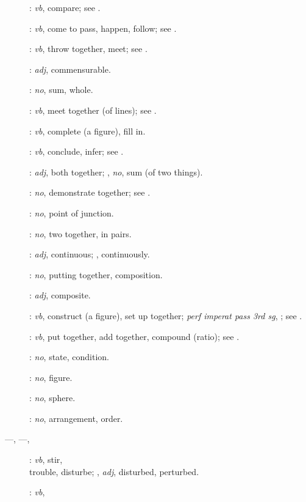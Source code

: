 {\begin{description}
\item[]: {\em vb}, compare; see .
\item[]: {\em vb}, come to pass, happen, follow; see
.
\item[]: {\em vb}, throw together, meet; see .
\item[]: {\em adj}, commensurable.
\item[]: {\em no}, sum, whole.
\item[]: {\em vb}, meet together (of lines); see .
\item[]: {\em vb}, complete (a figure), fill in.
\item[]: {\em vb}, conclude, infer; see .
\item[]: {\em adj}, both together;
, {\em no}, sum (of two things).
\item[]: {\em no}, demonstrate together; see .
\item[]: {\em no}, point of junction.
\item[]: {\em no}, two together, in pairs.
\item[]: {\em adj}, continuous; , 
continuously.
\item[]: {\em no}, putting together, composition.
\item[]: {\em adj}, composite.
\item[]: {\em vb}, construct (a figure), set up together;  {\em perf imperat pass 3rd sg}, ; see .
\item[]: {\em vb}, put together, add together, compound (ratio); see .
\item[]: {\em no}, state, condition.
\item[]: {\em no}, figure.
\item[]: {\em no}, sphere.
\item[]: {\em no}, arrangement, order.
\item[ ---, ---, ]: {\em vb}, stir,\\ trouble, disturbe; , {\em adj}, disturbed, perturbed.
\item[]: {\em vb},

\end{description}}
